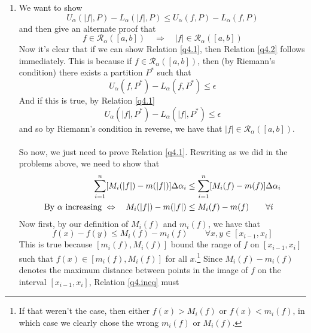 \documentclass[12pt]{article}
\theoremstyle{plain}
\theoremstyle{definition}
\theoremstyle{remark}
\begin{document}
\begin{enumerate}
            
        
\item We want to show 
    \begin{equation}
        \label{q4.1}
        U_\alpha(|f|, P) - L_\alpha(|f|, P) \leq
        U_\alpha(f, P) - L_\alpha(f, P) 
    \end{equation}
    and  then give an alternate proof that 
    \begin{equation}
        \label{q4.2}
         f \in \mathscr{R}_\alpha([a,b]) \quad \Rightarrow
            \quad  |f| \in \mathscr{R}_\alpha([a,b]) 
    \end{equation}
    Now it's clear that if we can show Relation \ref{q4.1},
    then Relation \ref{q4.2} follows immediately. This is 
    because if $f \in \mathscr{R}_\alpha([a,b])$, then
    (by Riemann's condition) there exists a partition 
    $P^*$ such that 
        \[ U_\alpha(f, P^*) - L_\alpha(f, P^*) \leq \epsilon \]
    And if this is true, by Relation \ref{q4.1}
        \[ U_\alpha(|f|, P^*) - L_\alpha(|f|, P^*) \leq \epsilon \]
    and so by Riemann's condition in reverse, we have
    that $|f| \in \mathscr{R}_\alpha([a,b])$.
    \\
    \\
    So now, we just need to prove Relation \ref{q4.1}.
    Rewriting as we did in the problems above, we 
    need to show that
    \begin{align}
        \sum^n_{i=1} [M_i(|f|) - m(|f|)]\Delta \alpha_i
        &\leq \sum^n_{i=1} [M_i(f) - m(f)]\Delta \alpha_i 
        \notag \\
        \text{By $\alpha$ increasing }
        \Leftrightarrow \quad
            M_i(|f|) - m(|f|) &\leq M_i(f) - m(f)
            \qquad \forall i
            \label{equiv}
    \end{align}
    Now first, by our definition of $M_i(f)$ and
    $m_i(f)$, we have that
    \begin{equation}
        \label{q4.ineq}
        f(x) - f(y) \leq M_i(f) - m_i(f) 
        \qquad \forall x,y \in [x_{i-1}, x_i]
    \end{equation}
    This is true because $[m_i(f), M_i(f)]$ bound 
    the range of $f$ on $[x_{i-1}, x_i]$ such that
    $f(x) \in [m_i(f), M_i(f)]$ for all $x$.\footnote{If
    that weren't the case, then either 
    $f(x)>M_i(f)$ or $f(x)<m_i(f)$, in which case
    we clearly chose the wrong $m_i(f)$ or $M_i(f)$.}
    Since $M_i(f) - m_i(f)$ denotes the maximum distance 
    between points in the image of $f$ on the interval
    $[x_{i-1}, x_i]$, Relation \ref{q4.ineq} must 

\end{enumerate}
\end{document}
